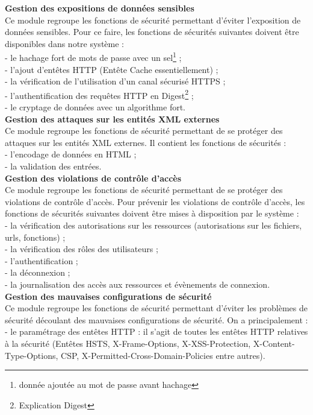 \textbf{\RIGHTarrow Gestion des expositions de données sensibles}\\
Ce module regroupe les fonctions de sécurité permettant d'éviter l'exposition de données sensibles. Pour ce faire, les fonctions de sécurités suivantes doivent être disponibles dans notre système : \\
- le hachage fort de mots de passe avec un sel\footnote{donnée ajoutée au mot de passe avant hachage} ; \\
- l'ajout d'entêtes HTTP (Entête Cache essentiellement) ; \\
- la vérification de l'utilisation d'un canal sécurisé HTTPS ; \\
- l'authentification des requêtes HTTP en Digest\footnote{Explication Digest} ; \\
- le cryptage de données avec un algorithme fort.\\

\textbf{\RIGHTarrow Gestion des attaques sur les entités XML externes}\\
Ce module regroupe les fonctions de sécurité permettant de se protéger des attaques sur les entités XML externes. Il contient les fonctions de sécurités : \\
- l'encodage de données en HTML ; \\
- la validation des entrées.\\

\textbf{\RIGHTarrow Gestion des violations de contrôle d’accès}\\
Ce module regroupe les fonctions de sécurité permettant de se protéger des violations de contrôle d'accès. Pour prévenir les violations de contrôle d'accès, les fonctions de sécurités suivantes doivent être mises à disposition par le système : \\
- la vérification des autorisations sur les ressources (autorisations sur les fichiers, urls, fonctions) ; \\
- la vérification des rôles des utilisateurs ; \\
- l'authentification ; \\
- la déconnexion ; \\
- la journalisation des accès aux ressources et évènements de connexion.\\

\textbf{\RIGHTarrow Gestion des mauvaises configurations de sécurité}\\
Ce module regroupe les fonctions de sécurité permettant d'éviter les problèmes de sécurité découlant des mauvaises configurations de sécurité. On a principalement : \\
- le paramétrage des entêtes HTTP : il s'agit de toutes les entêtes HTTP relatives à la sécurité (Entêtes HSTS, X-Frame-Options, X-XSS-Protection, X-Content-Type-Options, CSP, X-Permitted-Cross-Domain-Policies entre autres). \\

